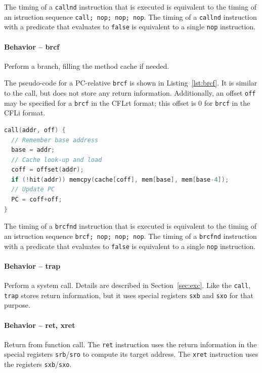\documentclass[a4paper,fontsize=10pt,twoside,DIV15,BCOR12mm,headinclude=true,footinclude=false,pagesize,bibtotoc]{scrbook}
\begin{document}
The timing of a \texttt{callnd} instruction that is executed is
equivalent to the timing of an istruction sequence \texttt{call; nop;
  nop; nop}. The timing of a \texttt{callnd} instruction with a
predicate that evaluates to \texttt{false} is equivalent to a single
\texttt{nop} instruction.

\paragraph{Behavior -- brcf}

Perform a branch, filling the method cache if needed.

The pseudo-code for a PC-relative \texttt{brcf} is shown in
Listing~\ref{lst:brcf}. It is similar to the call, but does not store
any return information. Additionally, an offset \texttt{off} may be
specified for a \texttt{brcf} in the CFLrt format; this offset is 0
for \texttt{brcf} in the CFLi format.

\begin{lstlisting}[language=C,float=h,caption={Branch with cache fill\label{lst:brcf}}]
call(addr, off) {
  // Remember base address
  base = addr;
  // Cache look-up and load
  coff = offset(addr);
  if (!hit(addr)) memcpy(cache[coff], mem[base], mem[base-4]);
  // Update PC
  PC = coff+off;
}
\end{lstlisting}

The timing of a \texttt{brcfnd} instruction that is executed is
equivalent to the timing of an istruction sequence \texttt{brcf; nop;
  nop; nop}. The timing of a \texttt{brcfnd} instruction with a
predicate that evaluates to \texttt{false} is equivalent to a single
\texttt{nop} instruction.

\paragraph{Behavior -- trap}

Perform a system call. Details are described in Section~\ref{sec:exc}.
Like the \texttt{call}, \texttt{trap} stores return information, but
it uses special registers \texttt{sxb} and \texttt{sxo} for that
purpose.

\paragraph{Behavior -- ret, xret}

Return from function call. The \texttt{ret} instruction uses the
return information in the special registers \texttt{srb}/\texttt{sro}
to compute its target address. The \texttt{xret} instruction uses the
registers \texttt{sxb}/\texttt{sxo}.
\end{document}
